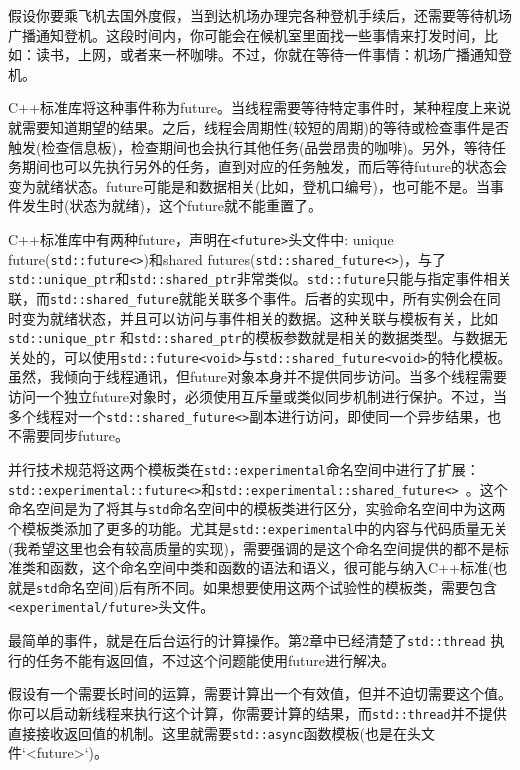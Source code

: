 
假设你要乘飞机去国外度假，当到达机场办理完各种登机手续后，还需要等待机场广播通知登机。这段时间内，你可能会在候机室里面找一些事情来打发时间，比如：读书，上网，或者来一杯咖啡。不过，你就在等待一件事情：机场广播通知登机。

C++标准库将这种事件称为future。当线程需要等待特定事件时，某种程度上来说就需要知道期望的结果。之后，线程会周期性(较短的周期)的等待或检查事件是否触发(检查信息板)，检查期间也会执行其他任务(品尝昂贵的咖啡)。另外，等待任务期间也可以先执行另外的任务，直到对应的任务触发，而后等待future的状态会变为就绪状态。future可能是和数据相关(比如，登机口编号)，也可能不是。当事件发生时(状态为就绪)，这个future就不能重置了。

C++标准库中有两种future，声明在\texttt{<future>}头文件中: unique future(\texttt{std::future<>})和shared futures(\texttt{std::shared\_future<>})，与了\texttt{std::unique\_ptr}和\texttt{std::shared\_ptr}非常类似。\texttt{std::future}只能与指定事件相关联，而\texttt{std::shared\_future}就能关联多个事件。后者的实现中，所有实例会在同时变为就绪状态，并且可以访问与事件相关的数据。这种关联与模板有关，比如\texttt{std::unique\_ptr} 和\texttt{std::shared\_ptr}的模板参数就是相关的数据类型。与数据无关处的，可以使用\texttt{std::future<void>}与\texttt{std::shared\_future<void>}的特化模板。虽然，我倾向于线程通讯，但future对象本身并不提供同步访问。当多个线程需要访问一个独立future对象时，必须使用互斥量或类似同步机制进行保护。不过，当多个线程对一个\texttt{std::shared\_future<>}副本进行访问，即使同一个异步结果，也不需要同步future。

并行技术规范将这两个模板类在\texttt{std::experimental}命名空间中进行了扩展：\texttt{std::experimental::future<>}和\texttt{std::experimental::shared\_future<> }。这个命名空间是为了将其与\texttt{std}命名空间中的模板类进行区分，实验命名空间中为这两个模板类添加了更多的功能。尤其是\texttt{std::experimental}中的内容与代码质量无关(我希望这里也会有较高质量的实现)，需要强调的是这个命名空间提供的都不是标准类和函数，这个命名空间中类和函数的语法和语义，很可能与纳入C++标准(也就是\texttt{std}命名空间)后有所不同。如果想要使用这两个试验性的模板类，需要包含\texttt{<experimental/future>}头文件。

最简单的事件，就是在后台运行的计算操作。第2章中已经清楚了\texttt{std::thread} 执行的任务不能有返回值，不过这个问题能使用future进行解决。


假设有一个需要长时间的运算，需要计算出一个有效值，但并不迫切需要这个值。你可以启动新线程来执行这个计算，你需要计算的结果，而\texttt{std::thread}并不提供直接接收返回值的机制。这里就需要\texttt{std::async}函数模板(也是在头文件`<future>`)。

